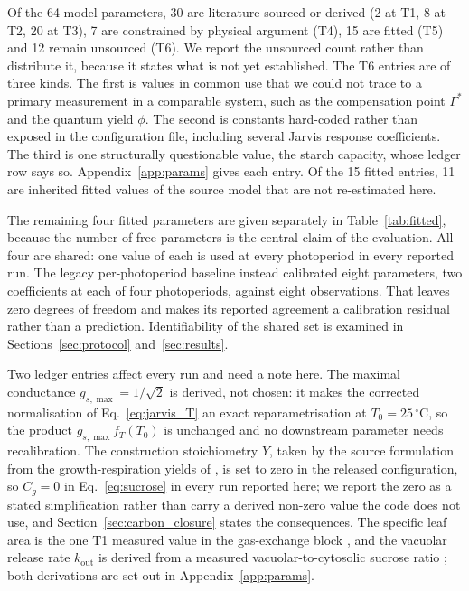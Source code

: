 Of the 64 model parameters, 30 are literature-sourced or derived (2 at T1, 8 at
T2, 20 at T3), 7 are constrained by physical argument (T4), 15 are fitted (T5)
and 12 remain unsourced (T6). We report the unsourced count rather than
distribute it, because it states what is not yet established. The T6 entries are
of three kinds. The first is values in common use that we could not trace to a
primary measurement in a comparable system, such as the compensation point
$\Gamma^{*}$ and the quantum yield $\phi$. The second is constants hard-coded
rather than exposed in the configuration file, including several Jarvis response
coefficients. The third is one structurally questionable value, the starch
capacity, whose ledger row says so. Appendix~\ref{app:params} gives each entry. Of the 15 fitted entries, 11 are
inherited fitted values of the source model that are not re-estimated here.

The remaining four fitted parameters are given separately in
Table~\ref{tab:fitted}, because the number of free parameters is the central
claim of the evaluation. All four are shared: one value of each is used at every
photoperiod in every reported run. The legacy per-photoperiod baseline instead
calibrated eight parameters, two coefficients at each of four photoperiods,
against eight observations. That leaves zero degrees of freedom and makes its
reported agreement a calibration residual rather than a prediction.
Identifiability of the shared set is examined in
Sections~\ref{sec:protocol} and~\ref{sec:results}.

Two ledger entries affect every run and need a note here. The maximal
conductance $g_{s,\max} = 1/\sqrt{2}$ is derived, not chosen: it makes the
corrected normalisation of Eq.~\eqref{eq:jarvis_T} an exact reparametrisation at
$T_0 = 25\,^\circ$C, so the product $g_{s,\max} f_T(T_0)$ is unchanged and no
downstream parameter needs recalibration. The construction stoichiometry $Y$, taken by the source formulation from the
growth-respiration yields of \citet{PenningDeVries1989}, is set to zero in the
released configuration, so $C_g = 0$ in Eq.~\eqref{eq:sucrose} in every run
reported here; we report the zero as a stated simplification rather than carry a
derived non-zero value the code does not use,
and Section~\ref{sec:carbon_closure} states the consequences. The specific leaf
area is the one T1 measured value in the gas-exchange block
\citep{Tolleter2024}, and the vacuolar release rate $k_{\mathrm{out}}$ is derived
from a measured vacuolar-to-cytosolic sucrose ratio \citep{Seydel2025}; both
derivations are set out in Appendix~\ref{app:params}.

